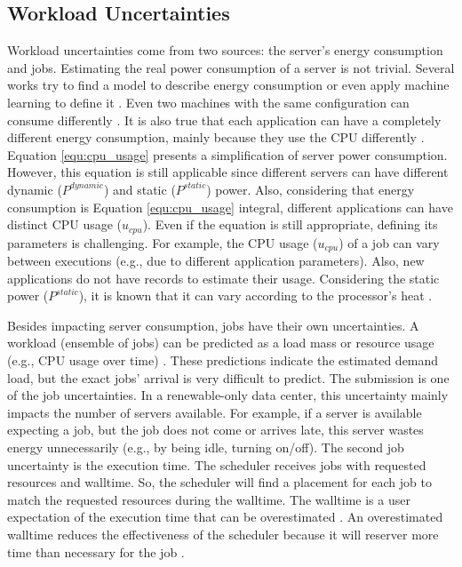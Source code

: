 
\subsection{Workload Uncertainties}
Workload uncertainties come from two sources: the server's energy consumption and jobs. Estimating the real power consumption of a server is not trivial. Several works try to find a model to describe energy consumption or even apply machine learning to define it \cite{dayarathna2015data}. Even two machines with the same configuration can consume differently \cite{orgerie2010demystifying}. It is also true that each application can have a completely different energy consumption, mainly because they use the CPU differently \cite{orgerie2010demystifying}. Equation \ref{equ:cpu_usage} presents a simplification of server power consumption. However, this equation is still applicable since different servers can have different dynamic ($P^{dynamic}$) and static ($P^{static}$) power. Also, considering that energy consumption is Equation \ref{equ:cpu_usage} integral, different applications can have distinct CPU usage ($u_{cpu}$). Even if the equation is still appropriate, defining its parameters is challenging. For example, the CPU usage ($u_{cpu}$) of a job can vary between executions (e.g., due to different application parameters). Also, new applications do not have records to estimate their usage. Considering the static power ($P^{static}$), it is known that it can vary according to the processor's heat \cite{patterson2008effect}.

Besides impacting server consumption, jobs have their own uncertainties. A workload (ensemble of jobs) can be predicted as a load mass or resource usage (e.g., CPU usage over time) \cite{masdari2020survey, vashistha2020literature}. These predictions indicate the estimated demand load, but the exact jobs' arrival is very difficult to predict. The submission is one of the job uncertainties. In a renewable-only data center, this uncertainty mainly impacts the number of servers available. For example, if a server is available expecting a job, but the job does not come or arrives late, this server wastes energy unnecessarily (e.g., by being idle, turning on/off). The second job uncertainty is the execution time. The scheduler receives jobs with requested resources and walltime. So, the scheduler will find a placement for each job to match the requested resources during the walltime. The walltime is a user expectation of the execution time that can be overestimated \cite{takizawa2020effect}. An overestimated walltime reduces the effectiveness of the scheduler because it will reserver more time than necessary for the job \cite{srinivasan2002characterization, takizawa2020effect}.

